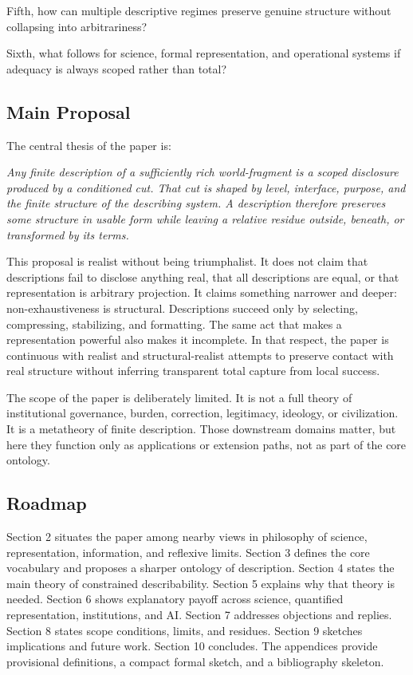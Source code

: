 \documentclass[11pt]{article}
\renewenvironment{quote}
  {\list{}{\leftmargin=1.4em \rightmargin=1.0em}%
   \item\relax\color{softink}\itshape}
  {\endlist}
\begin{document}
Fifth, how can multiple descriptive regimes preserve genuine structure without collapsing into arbitrariness?

Sixth, what follows for science, formal representation, and operational systems if adequacy is always scoped rather than total?

\subsection{Main Proposal}

The central thesis of the paper is:

\begin{quote}
Any finite description of a sufficiently rich world-fragment is a scoped disclosure produced by a conditioned cut. That cut is shaped by level, interface, purpose, and the finite structure of the describing system. A description therefore preserves some structure in usable form while leaving a relative residue outside, beneath, or transformed by its terms.
\end{quote}

This proposal is realist without being triumphalist. It does not claim that descriptions fail to disclose anything real, that all descriptions are equal, or that representation is arbitrary projection. It claims something narrower and deeper: non-exhaustiveness is structural. Descriptions succeed only by selecting, compressing, stabilizing, and formatting. The same act that makes a representation powerful also makes it incomplete. In that respect, the paper is continuous with realist and structural-realist attempts to preserve contact with real structure without inferring transparent total capture from local success. \cite{chakravartty_scientific_realism_sep,ladyman_structural_realism_sep,scientific_pluralism_sep}

The scope of the paper is deliberately limited. It is not a full theory of institutional governance, burden, correction, legitimacy, ideology, or civilization. It is a metatheory of finite description. Those downstream domains matter, but here they function only as applications or extension paths, not as part of the core ontology.

\subsection{Roadmap}

Section 2 situates the paper among nearby views in philosophy of science, representation, information, and reflexive limits. Section 3 defines the core vocabulary and proposes a sharper ontology of description. Section 4 states the main theory of constrained describability. Section 5 explains why that theory is needed. Section 6 shows explanatory payoff across science, quantified representation, institutions, and AI. Section 7 addresses objections and replies. Section 8 states scope conditions, limits, and residues. Section 9 sketches implications and future work. Section 10 concludes. The appendices provide provisional definitions, a compact formal sketch, and a bibliography skeleton.
\end{document}
